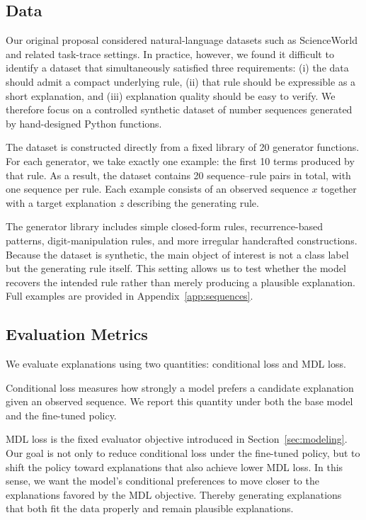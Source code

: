\documentclass{article}
\theoremstyle{plain}
\theoremstyle{definition}
\theoremstyle{remark}
\begin{document}
\subsection{Data}

Our original proposal considered natural-language datasets such as ScienceWorld \citep{wang-etal-2022-scienceworld} and related task-trace settings. In practice, however, we found it difficult to identify a dataset that simultaneously satisfied three requirements: (i) the data should admit a compact underlying rule, (ii) that rule should be expressible as a short explanation, and (iii) explanation quality should be easy to verify. We therefore focus on a controlled synthetic dataset of number sequences generated by hand-designed Python functions.

The dataset is constructed directly from a fixed library of 20 generator functions. For each generator, we take exactly one example: the first 10 terms produced by that rule. As a result, the dataset contains 20 sequence--rule pairs in total, with one sequence per rule. Each example consists of an observed sequence $x$ together with a target explanation $z$ describing the generating rule.

The generator library includes simple closed-form rules, recurrence-based patterns, digit-manipulation rules, and more irregular handcrafted constructions. Because the dataset is synthetic, the main object of interest is not a class label but the generating rule itself. This setting allows us to test whether the model recovers the intended rule rather than merely producing a plausible explanation. Full examples are provided in Appendix~\ref{app:sequences}.

\subsection{Evaluation Metrics}

We evaluate explanations using two quantities: conditional loss and MDL loss.

Conditional loss measures how strongly a model prefers a candidate explanation given an observed sequence. We report this quantity under both the base model and the fine-tuned policy.

MDL loss is the fixed evaluator objective introduced in Section~\ref{sec:modeling}. Our goal is not only to reduce conditional loss under the fine-tuned policy, but to shift the policy toward explanations that also achieve lower MDL loss. In this sense, we want the model's conditional preferences to move closer to the explanations favored by the MDL objective. Thereby generating explanations that both fit the data properly and remain plausible explanations.
\end{document}

